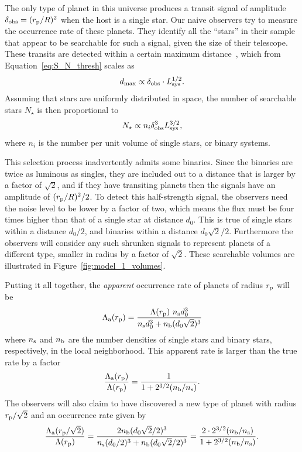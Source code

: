 \documentclass[12pt,modern]{aastex61}
\renewcommand{\a}{_{\rm a}}
\newcommand{\s}{_{\rm s}}
\newcommand{\p}{_{\rm p}}
\renewcommand{\b}{_{\rm b}}
\begin{document}
The only type of planet in this universe produces a transit signal of
amplitude $\delta_{\rm obs} = (r\p/R)^2$ when the host is a single
star.  Our naive observers try to measure the occurrence rate of these
planets.  They identify all the ``stars'' in their sample that appear
to be searchable for such a signal, given the size of their telescope.
These transits are detected within a certain maximum 
distance~\citep[see][]{pepper_using_2003,pepper_searching_2005}, which from
Equation~\ref{eq:S_N_thresh} scales as
\begin{equation}
  d_{\rm max} \propto \delta_{\rm obs} \cdot L_{\rm sys}^{1/2}.
  \label{eq:dmax}
\end{equation}
Assuming that stars are uniformly distributed in space, the number of
searchable stars $N_\star$ is then proportional to
\begin{equation}
    N_\star \propto n_i \delta_{\rm obs}^3 L_{\rm sys}^{3/2},
\label{eq:N_searchable_prop}
\end{equation}
where $n_i$ is the number per unit volume of single stars, or
binary systems. 
 
This selection process inadvertently admits some binaries.  Since the
binaries are twice as luminous as singles, they are included out to a
distance that is larger by a factor of $\sqrt{2}$, and if they have
transiting planets then the signals have an amplitude of
$(r\p/R)^2/2$.  To detect this half-strength signal, the observers
need the noise level to be lower by a factor of two, which means the
flux must be four times higher than that of a single star at distance
$d_0$.  This is true of single stars within a distance $d_0/2$, and
binaries within a distance $d_0\sqrt{2}/2$.
Furthermore the observers will consider any such shrunken signals to
represent planets of a different type, smaller in radius by a factor
of $\sqrt{2}$. These searchable volumes are illustrated in 
Figure~\ref{fig:model_1_volumes}.

Putting it all together, the {\it apparent} occurrence rate of planets
of radius $r\p$ will be
\begin{equation}
    \Lambda\a(r\p) = 
        \frac{\Lambda(r\p)~n\s d_0^3}
        {n\s d_0^3 + n\b (d_0\sqrt{2})^3}
\end{equation}
where $n\s$ and $n\b$ are the number densities of single stars and
binary stars, respectively, in the local neighborhood.  This apparent
rate is larger than the true rate by a factor
\begin{equation}
    \frac{\Lambda\a(r\p)}{\Lambda(r\p)} = 
        \frac{1}{1 + 2^{3/2}(n\b/n\s)}.
    \label{eq:correction_rp}
\end{equation}
The observers will also claim to have discovered a new type of planet
with radius $r\p/\sqrt{2}$ and an occurrence rate given by
\begin{equation}
\label{eq:correction_diluted_rp}
    \frac{\Lambda\a(r\p/\sqrt{2})}{\Lambda(r\p)}
    =
    \frac{2n\b (d_0\sqrt{2}/2)^3}
      {n\s (d_0/2)^3 + n\b (d_0\sqrt{2}/2)^3}
    =
    \frac{2\cdot2^{3/2}(n\b/n\s)}{1 + 2^{3/2}
    (n\b/n\s)}.
\end{equation}
\end{document}
